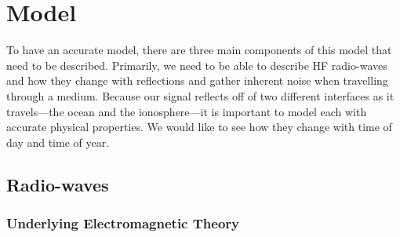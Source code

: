 \documentclass[11pt]{article}
\numberwithin{equation}{section}
\begin{document}
\section{Model} %
\label{sec:model}

To have an accurate model, there are three main components of this model that need to be described. Primarily, we need to be able to describe HF radio-waves and how they change with reflections and gather inherent noise when travelling through a medium. Because our signal reflects off of two different interfaces as it travels---the ocean and the ionosphere---it is important to model each with accurate physical properties. We would like to see how they change with time of day and time of year. 
\subsection{Radio-waves} %
\label{sub:radiowaves}

\subsubsection{Underlying Electromagnetic Theory} %
\label{ssub:emtheory}
\end{document}

